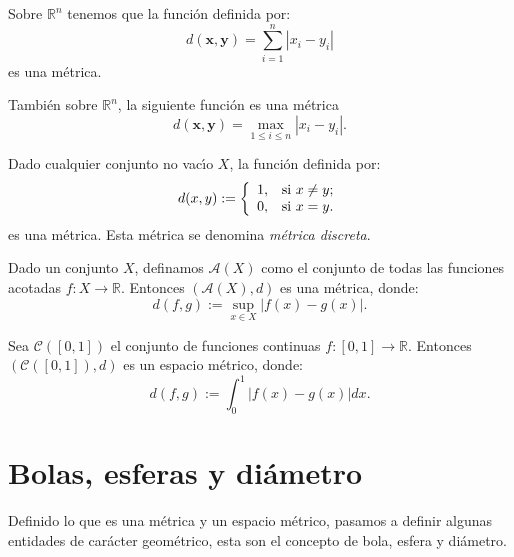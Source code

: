 \begin{ejemplo}\label{ejem,distl1} Sobre $\mathbb{R}^n$ tenemos que
la funci\'on
 definida por:
\begin{equation}\label{l1met}
	d(\mathbf{x},\mathbf{y})=\sum\limits_{i=1}^{n}|x_i-y_i|
\end{equation}
es una m\'etrica.
\end{ejemplo}

\begin{ejemplo}\label{ejem,distlinf}  Tambi\'en sobre $\mathbb{R}^n$,
la siguiente
funci\'on es una m\'etrica \begin{equation}\label{linfmet}
	d(\mathbf{x},\mathbf{y})=\max\limits_{1\leq i\leq n}|x_i-y_i|.
\end{equation}
\end{ejemplo}

\begin{ejemplo} Dado cualquier conjunto no vac\'{\i}o $X$, la
funci\'on definida por:
\[
	d(x,y):=\left\{
\begin{array}{ll}
	1, & \hbox{si $x\neq y$;} \\
	0, & \hbox{si $x=y$.} \\
\end{array}
\right.
\]
es una m\'etrica. Esta m\'etrica se denomina \emph{m\'etrica
discreta}.
\end{ejemplo}
\begin{ejemplo}\label{ejem,distsobrecont} Dado un conjunto $X$,
definamos $\mathcal{A}(X)$
como el conjunto de todas las funciones acotadas $f:X\rightarrow
\mathbb{R}$. Entonces $(\mathcal{A}(X),d)$ es una m\'etrica,
donde:
\begin{equation}\label{convunifmet}
	d(f,g):=\sup\limits_{x\in X}|f(x)-g(x)|.
\end{equation}
\end{ejemplo}

\begin{ejemplo}\label{ejem,distsobrecontl1} Sea $\mathcal{C}([0,1])$
el conjunto de funciones
continuas $f:[0,1]\rightarrow\mathbb{R}$. Entonces
$(\mathcal{C}([0,1]),d)$ es un espacio m\'etrico, donde:
\begin{equation}\label{l1metint}
	d(f,g):=\int_0^1|f(x)-g(x)|dx.
\end{equation}
\end{ejemplo}
\section{Bolas, esferas y di\'ametro}
Definido lo que es una m\'etrica y un espacio m\'etrico, pasamos a
definir algunas entidades de car\'acter geom\'etrico, esta son el
concepto de bola, esfera y di\'ametro.

